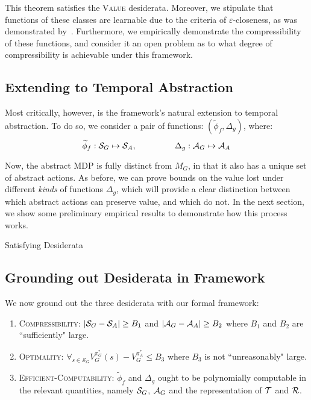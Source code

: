 This theorem satisfies the \textsc{Value} desiderata. Moreover, we stipulate that functions of these classes are learnable due to the criteria of $\varepsilon$-closeness, as was demonstrated by~\cite{ortner2007logarithmic}. Furthermore, we empirically demonstrate the compressibility of these functions, and consider it an open problem as to what degree of compressibility is achievable under this framework.

\subsection{Extending to Temporal Abstraction}
Most critically, however, is the framework's natural extension to temporal abstraction. To do so, we consider a pair of functions: $(\widetilde{\phi}_f, \Delta_g)$, where:
\begin{equation}
\widetilde{\phi}_f: \mathcal{S}_G \mapsto \mathcal{S}_A, \hspace{16mm} \Delta_g : \mathcal{A}_G \mapsto \mathcal{A}_A
\end{equation}

Now, the abstract MDP is fully distinct from $M_G$, in that it also has a unique set of abstract actions. As before, we can prove bounds on the value lost under different {\it kinds} of functions $\Delta_g$, which will provide a clear distinction between which abstract actions can preserve value, and which do not. In the next section, we show some preliminary empirical results to demonstrate how this process works.

Satisfying Desiderata


\subsection{Grounding out Desiderata in Framework}

We now ground out the three desiderata with our formal framework:

\begin{enumerate}
\item \textsc{Compressibility}: $|\mathcal{S}_G - \mathcal{S}_A| \geq B_1$ and $|\mathcal{A}_G - \mathcal{A}_A| \geq B_2$ where $B_1$ and $B_2$ are ``sufficiently" large.

\item \textsc{Optimality}: $\forall_{s \in \mathcal{S}_G} V_G^{\pi_G^*}(s) - V_G^{\pi_{A}^*} \leq B_3$ where $B_3$ is not ``unreasonably" large.

\item \textsc{Efficient-Computability}: $\widetilde{\phi}_f$ and $\Delta_g$ ought to be polynomially computable in the relevant quantities, namely $\mathcal{S}_G$, $\mathcal{A}_G$ and the representation of $\mathcal{T}$ and $\mathcal{R}$.
\end{enumerate}



